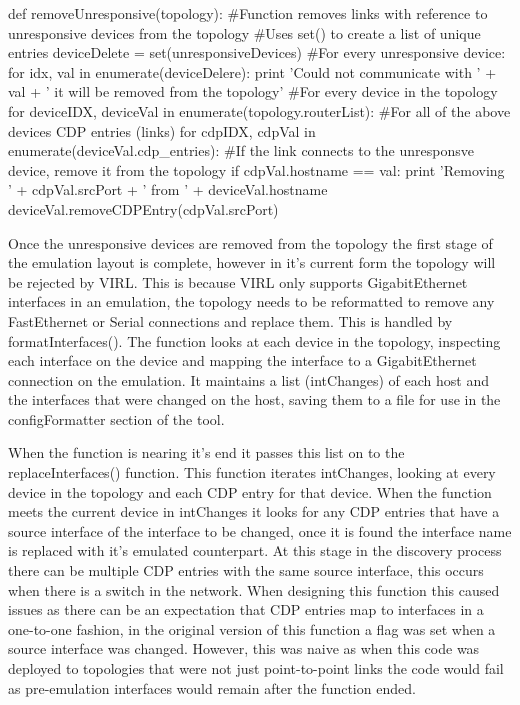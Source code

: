 \documentclass[11pt]{report}
\begin{document}
\begin{python}
def removeUnresponsive(topology):
	#Function removes links with reference to unresponsive devices from the topology
	#Uses set() to create a list of unique entries
	deviceDelete = set(unresponsiveDevices)
	#For every unresponsive device:
	for idx, val in enumerate(deviceDelere):
		print 'Could not communicate with ' + val + ' it will be removed from the topology'
		#For every device in the topology
		for deviceIDX, deviceVal in enumerate(topology.routerList):
			#For all of the above devices CDP entries (links)
			for cdpIDX, cdpVal in enumerate(deviceVal.cdp_entries):
				#If the link connects to the unresponsve device, remove it from the topology
				if cdpVal.hostname == val:
					print 'Removing ' + cdpVal.srcPort + ' from ' + deviceVal.hostname
					deviceVal.removeCDPEntry(cdpVal.srcPort)
\end{python}

Once the unresponsive devices are removed from the topology the first stage of the emulation layout is complete, however in it's current form the topology will be rejected by VIRL. This is because VIRL only supports GigabitEthernet interfaces in an emulation, the topology needs to be reformatted to remove any FastEthernet or Serial connections and replace them. This is handled by formatInterfaces(). The function looks at each device in the topology, inspecting each interface on the device and mapping the interface to a GigabitEthernet connection on the emulation. It maintains a list (intChanges) of each host and the interfaces that were changed on the host, saving them to a file for use in the configFormatter section of the tool.

When the function is nearing it's end it passes this list on to the replaceInterfaces() function. This function iterates intChanges, looking at every device in the topology and each CDP entry for that device. When the function meets the current device in intChanges it looks for any CDP entries that have a source interface of the interface to be changed, once it is found the interface name is replaced with it's emulated counterpart. At this stage in the discovery process there can be multiple CDP entries with the same source interface, this occurs when there is a switch in the network. When designing this function this caused issues as there can be an expectation that CDP entries map to interfaces in a one-to-one fashion, in the original version of this function a flag was set when a source interface was changed. However, this was naive as when this code was deployed to topologies that were not just point-to-point links the code would fail as pre-emulation interfaces would remain after the function ended.
\end{document}
